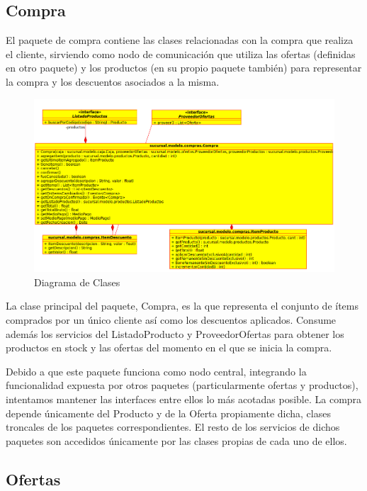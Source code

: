 \documentclass[a4paper,11pt]{article}
\begin{document}
\subsection{Compra}

El paquete de compra contiene las clases relacionadas con la compra que realiza
el cliente, sirviendo como nodo de comunicación que utiliza las ofertas
(definidas en otro paquete) y los productos (en su propio paquete también) para
representar la compra y los descuentos asociados a la misma.

\begin{figure}[!htp]
\begin{center}
\includegraphics[width=1\textwidth]{src/docs/compras.png}
\end{center}
\caption{Diagrama de Clases} \label{fig:compra}
\end{figure}

\FloatBarrier

La clase principal del paquete, Compra, es la que representa el conjunto de
ítems comprados por un único cliente así como los descuentos aplicados. Consume
además los servicios del ListadoProducto y ProveedorOfertas para obtener los
productos en stock y las ofertas del momento en el que se inicia la compra.

Debido a que este paquete funciona como nodo central, integrando la
funcionalidad expuesta por otros paquetes (particularmente ofertas y
productos), intentamos mantener las interfaces entre ellos lo más acotadas
posible. La compra depende únicamente del Producto y de la Oferta propiamente
dicha, clases troncales de los paquetes correspondientes. El resto de los
servicios de dichos paquetes son accedidos únicamente por las clases propias de
cada uno de ellos.

\subsection{Ofertas}
\end{document}
